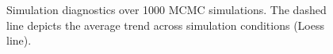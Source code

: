 \documentclass[article]{jss}
\begin{document}
\begin{figure}[h]
  \caption{Simulation diagnostics over 1000 MCMC simulations. The dashed line depicts the average trend across simulation conditions (Loess line).}
    \label{fig:sim}
\end{figure}

\end{document}
